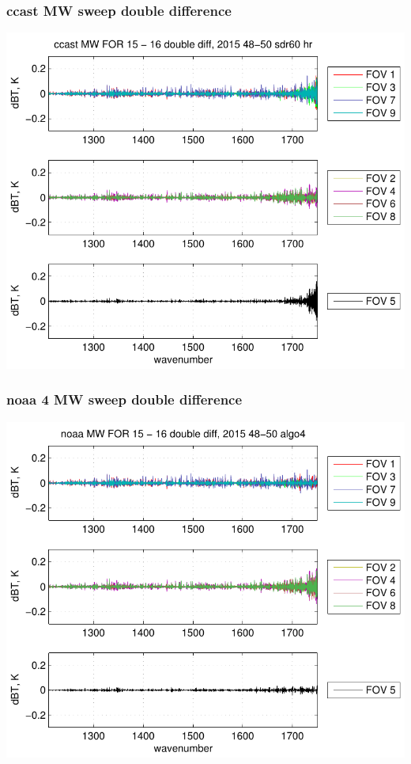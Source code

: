 \documentclass[11pt]{beamer}
\begin{document}
\begin{frame}
\frametitle{ccast MW sweep double difference}
\begin{center}
  \includegraphics[scale=0.7]{figures/ccast_MW_sfil_2015_48-50_sdr60_hr.pdf}
\end{center}
\end{frame}
\begin{frame}
\frametitle{noaa 4 MW sweep double difference}
\begin{center}
  \includegraphics[scale=0.7]{figures/noaa_MW_sfil_2015_48-50_algo4.pdf}
\end{center}
\end{frame}
\end{document}
